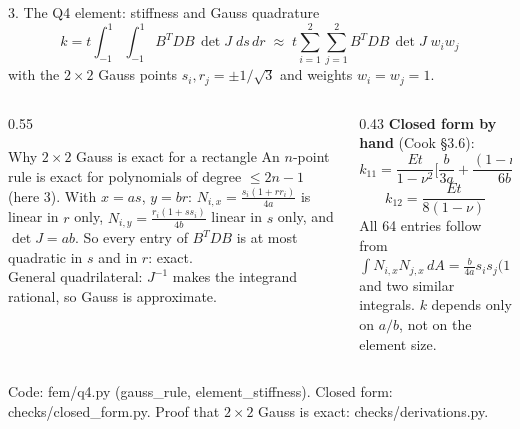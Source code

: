 \documentclass[aspectratio=169,10pt]{beamer}
\newcommand{\src}[1]{{\color{muted}\scriptsize #1}}
\begin{document}
\begin{frame}{3. The Q4 element: stiffness and Gauss quadrature}
  \[
    k=t\int_{-1}^{1}\!\!\int_{-1}^{1}B^TDB\,\det J\;ds\,dr
    \;\approx\;t\sum_{i=1}^{2}\sum_{j=1}^{2}B^TDB\,\det J\;w_iw_j
  \]
  with the $2\times2$ Gauss points $s_i,r_j=\pm1/\sqrt3$ and weights $w_i=w_j=1$.
  \begin{columns}[T]
    \begin{column}{0.55\textwidth}
      \begin{block}{Why $2\times2$ Gauss is exact for a rectangle}
        An $n$-point rule is exact for polynomials of degree $\le 2n-1$ (here 3).
        With $x=as$, $y=br$: $N_{i,x}=\frac{s_i(1+rr_i)}{4a}$ is linear in $r$ only,
        $N_{i,y}=\frac{r_i(1+ss_i)}{4b}$ linear in $s$ only, and $\det J=ab$.
        So every entry of $B^TDB$ is at most quadratic in $s$ and in $r$: exact.\\[2pt]
        General quadrilateral: $J^{-1}$ makes the integrand rational, so Gauss is approximate.
      \end{block}
    \end{column}
    \begin{column}{0.43\textwidth}
      \textbf{Closed form by hand} (Cook \S3.6):
      \[
        k_{11}=\frac{Et}{1-\nu^2}\Big[\frac{b}{3a}+\frac{(1-\nu)a}{6b}\Big]
      \]
      \[
        k_{12}=\frac{Et}{8(1-\nu)}
      \]
      All 64 entries follow from
      $\int N_{i,x}N_{j,x}\,dA=\frac{b}{4a}s_is_j\big(1+\frac{r_ir_j}{3}\big)$ and two similar integrals.
      $k$ depends only on $a/b$, not on the element size.
    \end{column}
  \end{columns}
  \vfill
  \src{Code: fem/q4.py (gauss\_rule, element\_stiffness). Closed form: checks/closed\_form.py. Proof that $2\times2$ Gauss is exact: checks/derivations.py.}
\end{frame}
\end{document}
